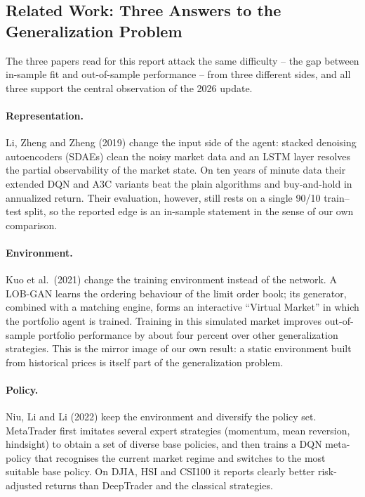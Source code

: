 \subsection{Related Work: Three Answers to the Generalization Problem}
\label{sec:related-work}

The three papers read for this report attack the same difficulty -- the gap between
in-sample fit and out-of-sample performance -- from three different sides, and all three
support the central observation of the 2026 update.

\paragraph{Representation.} Li, Zheng and Zheng (2019) change the input side of the agent:
stacked denoising autoencoders (SDAEs) clean the noisy market data and an LSTM layer
resolves the partial observability of the market state. On ten years of minute data their
extended DQN and A3C variants beat the plain algorithms and buy-and-hold in annualized
return. Their evaluation, however, still rests on a single 90/10 train--test split, so the
reported edge is an in-sample statement in the sense of our own comparison.

\paragraph{Environment.} Kuo et al.\ (2021) change the training environment instead of the
network. A LOB-GAN learns the ordering behaviour of the limit order book; its generator,
combined with a matching engine, forms an interactive ``Virtual Market'' in which the
portfolio agent is trained. Training in this simulated market improves out-of-sample
portfolio performance by about four percent over other generalization strategies. This is
the mirror image of our own result: a static environment built from historical prices is
itself part of the generalization problem.

\paragraph{Policy.} Niu, Li and Li (2022) keep the environment and diversify the policy set.
MetaTrader first imitates several expert strategies (momentum, mean reversion, hindsight) to
obtain a set of diverse base policies, and then trains a DQN meta-policy that recognises the
current market regime and switches to the most suitable base policy. On DJIA, HSI and CSI100
it reports clearly better risk-adjusted returns than DeepTrader and the classical
strategies.

